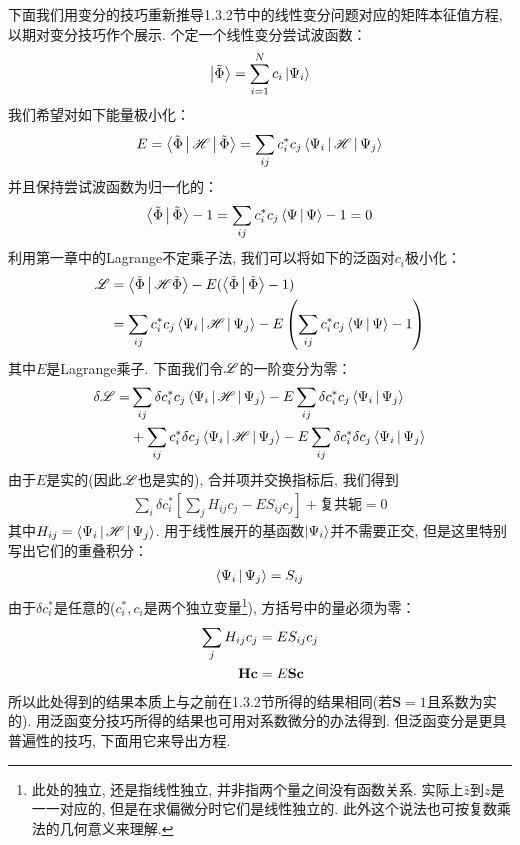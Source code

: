下面我们用变分的技巧重新推导1.3.2节中的线性变分问题对应的矩阵本征值方程, 以期对变分技巧作个展示. 个定一个线性变分尝试波函数：
\begin{align}
\Ket{\tilde{\Phi}} = \sum_{i=1}^{N}c_i\Ket{\Psi_i}
\end{align}
我们希望对如下能量极小化：
\begin{align}
E = \Braket{\tilde{\Phi}|\mathscr{H}|\tilde{\Phi}} = \sum_{ij} c_i^*c_j\Braket{\Psi_i|\mathscr{H}|\Psi_j}
\end{align}
并且保持尝试波函数为归一化的：
\begin{align}
\Braket{\tilde{\Phi}|\tilde{\Phi}} - 1 = \sum_{ij}c_i^*c_j \Braket{\Psi|\Psi} - 1 = 0
\end{align}
利用第一章中的Lagrange不定乘子法, 我们可以将如下的泛函对$c_i$极小化：
\begin{align}
\mathscr{L} & = \Braket{\tilde{\Phi}|\mathscr{H}\tilde{\Phi}} - E(\Braket{\tilde{\Phi}|\tilde{\Phi}}-1) \notag\\
            & = \sum_{ij}c_i^*c_j\Braket{\Psi_i|\mathscr{H}|\Psi_j} - E\left( \sum_{ij}c_i^*c_j \Braket{\Psi|\Psi} - 1 \right)
\end{align}
其中$E$是Lagrange乘子. 下面我们令$\mathscr{L}$的一阶变分为零：
\begin{align}
\delta\mathscr{L} = & \sum_{ij}\delta c_i^*c_j\Braket{\Psi_i|\mathscr{H}|\Psi_j} - E\sum_{ij}\delta c_i^*c_j\Braket{\Psi_i|\Psi_j} \notag \\
              & +  \sum_{ij}c_i^*\delta c_j\Braket{\Psi_i|\mathscr{H}|\Psi_j} - E\sum_{ij}\delta c_i^*\delta c_j\Braket{\Psi_i|\Psi_j}
\end{align}
由于$E$是实的(因此$\mathscr{L}$也是实的), 合并项并交换指标后, 我们得到
\begin{align}
\sum_i\delta c_i^*\left[ \sum_j H_{ij}c_j - ES_{ij}c_j \right] + \text{复共轭} = 0
\end{align}
其中$H_{ij} = \Braket{\Psi_i|\mathscr{H}|\Psi_j}$. 用于线性展开的基函数$\Ket{\Psi_i}$并不需要正交, 但是这里特别写出它们的重叠积分：
\begin{align}
\Braket{\Psi_i|\Psi_j} = S_{ij}
\end{align}
由于$\delta c_i^*$是任意的($c_i^*,c_i$是两个独立变量\footnote{
此处的独立, 还是指线性独立, 并非指两个量之间没有函数关系. 实际上$\bar{z}$到$z$是一一对应的, 但是在求偏微分时它们是线性独立的. 此外这个说法也可按复数乘法的几何意义来理解.
%
%
%
}), 方括号中的量必须为零：
\begin{align}
\sum_j H_{ij}c_j & = ES_{ij}c_j \notag\\
\mathbf{Hc} & = E\mathbf{Sc}
\end{align}
所以此处得到的结果本质上与之前在1.3.2节所得的结果相同(若$\mathbf{S}=1$且系数为实的). 用泛函变分技巧所得的结果也可用对系数微分的办法得到. 但泛函变分是更具普遍性的技巧, 下面用它来导出\hft 方程. 
